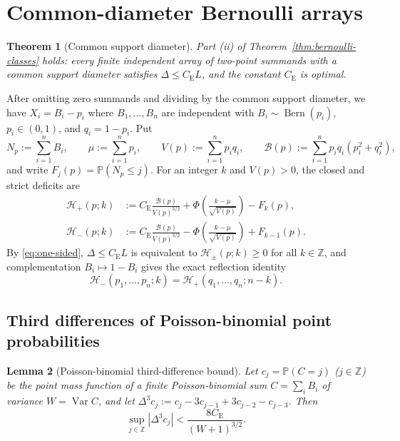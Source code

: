 \documentclass[11pt]{article}
\numberwithin{equation}{section}
\newtheorem{theorem}{Theorem}[section]
\newtheorem{lemma}[theorem]{Lemma}
\theoremstyle{definition}
\theoremstyle{remark}
\DeclareMathOperator{\Var}{Var}
\DeclareMathOperator{\Bern}{Bern}
\newcommand{\Pp}{\mathbb P}
\newcommand{\Z}{\mathbb Z}
\newcommand{\be}{C_{\mathrm E}}
\begin{document}
\section{Common-diameter Bernoulli arrays}\label{sec:equal-gap-two-point}

\begin{theorem}[Common support diameter]\label{thm:equal-gap-two-point}
Part \textup{(ii)} of Theorem~\ref{thm:bernoulli-classes} holds: every finite
independent array of two-point summands with a common support diameter
satisfies $\Delta\le\be L$, and the constant $\be$ is optimal.
\end{theorem}

After omitting zero summands and dividing by the common support diameter,
we have $X_i=B_i-p_i$ where $B_1,\ldots,B_n$ are independent with
$B_i\sim\Bern(p_i)$, $p_i\in(0,1)$, and $q_i=1-p_i$. Put
\begin{equation}
 N_p:=\sum_{i=1}^nB_i,\qquad
 \mu:=\sum_{i=1}^np_i,\qquad
 V(p):=\sum_{i=1}^np_iq_i,
 \qquad
 \mathcal B(p):=\sum_{i=1}^np_iq_i(p_i^2+q_i^2),
 \label{eq:equal-gap-bernoulli-data}
\end{equation}
and write $F_j(p)=\Pp(N_p\leq j)$. For an integer $k$ and $V(p)>0$, the closed
and strict deficits are
\begin{align}
 \mathcal H_+(p;k)
 &:=\be\frac{\mathcal B(p)}{V(p)^{3/2}}
   +\Phi\!\left(\frac{k-\mu}{\sqrt{V(p)}}\right)-F_k(p),
 \label{eq:equal-gap-closed-deficit}\\
 \mathcal H_-(p;k)
 &:=\be\frac{\mathcal B(p)}{V(p)^{3/2}}
   -\Phi\!\left(\frac{k-\mu}{\sqrt{V(p)}}\right)+F_{k-1}(p).
 \label{eq:equal-gap-strict-deficit}
\end{align}
By \eqref{eq:one-sided}, $\Delta\le\be L$ is equivalent to
$\mathcal H_\pm(p;k)\ge0$ for all $k\in\Z$, and complementation $B_i\mapsto1-B_i$
gives the exact reflection identity
\begin{equation}
 \mathcal H_-(p_1,\ldots,p_n;k)
 =\mathcal H_+(q_1,\ldots,q_n;n-k).
 \label{eq:equal-gap-owner-reflection}
\end{equation}

\subsection{Third differences of Poisson-binomial point probabilities}

\begin{samepage}
\begin{lemma}[Poisson-binomial third-difference bound]\label{lem:poisson-binomial-third-difference}
Let $c_j=\Pp(C=j)$ ($j\in\Z$) be the point mass function of a finite
Poisson-binomial sum $C=\sum_i B_i$ of variance $W=\Var C$, and let
$\Delta^3c_j:=c_j-3c_{j-1}+3c_{j-2}-c_{j-3}$. Then
\begin{equation}
 \sup_{j\in\Z}|\Delta^3c_j|
 < \frac{8\be}{(W+1)^{3/2}}.
 \label{eq:poisson-binomial-third-difference}
\end{equation}
\end{lemma}
\end{samepage}
\end{document}
